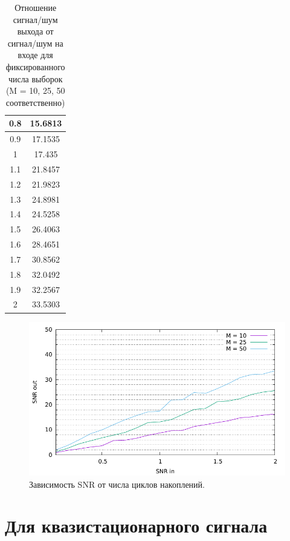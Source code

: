 \documentclass[12pt, a4paper] {ncc}
\begin{document}
\begin{table}[H]
\begin{tabular} { |c|c| }
                        0.8  &   15.6813 \\ \hline
                        0.9  &   17.1535 \\ \hline
                        1    &   17.435 \\ \hline
                        1.1  &   21.8457 \\ \hline
                        1.2  &   21.9823 \\ \hline
                        1.3  &   24.8981 \\ \hline
                        1.4  &   24.5258 \\ \hline
                        1.5  &   26.4063 \\ \hline
                        1.6  &   28.4651 \\ \hline
                        1.7  &   30.8562 \\ \hline
                        1.8  &   32.0492 \\ \hline
                        1.9  &   32.2567 \\ \hline
                        2    &   33.5303 \\ \hline
            \end{tabular}
            \caption{Отношение сигнал/шум выхода от сигнал/шум на входе для фиксированного числа выборок (M = 10, 25, 50 соответственно)}
        \end{table}

        \begin{figure}[H]
            \centering
            \includegraphics[scale=0.9,page=1]{stat_by_snr.pdf}
            \caption{Зависимость SNR от числа циклов накоплений.}
        \end{figure}

\section{Для квазистационарного сигнала}
\end{document}
